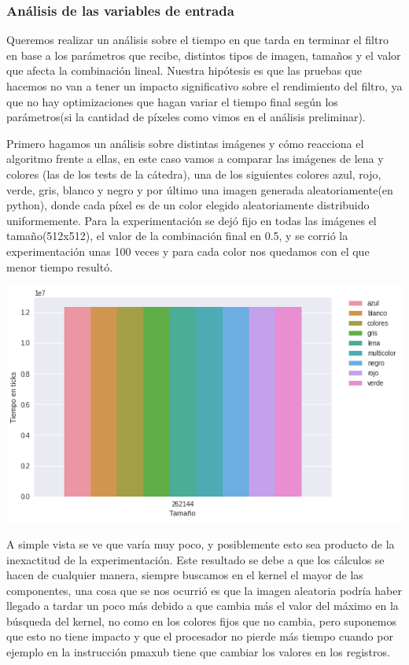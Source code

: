 \subsubsection*{Análisis de las variables de entrada}

Queremos realizar un análisis sobre el tiempo en que tarda en terminar el filtro en base a los parámetros que recibe, distintos tipos de imagen, tamaños y el valor que afecta la combinación lineal. Nuestra hipótesis es que las pruebas que hacemos no van a tener un impacto significativo sobre el rendimiento del filtro, ya que no hay optimizaciones que hagan variar el tiempo final según los parámetros(si la cantidad de píxeles como vimos en el análisis preliminar).

Primero hagamos un análisis sobre distintas imágenes y cómo reacciona el algoritmo frente a ellas, en este caso vamos a comparar las imágenes de lena y colores (las de los tests de la cátedra), una de los siguientes colores azul, rojo, verde, gris, blanco y negro y por último una imagen generada aleatoriamente(en python), donde cada píxel es de un color elegido aleatoriamente distribuido uniformemente. Para la experimentación se dejó fijo en todas las imágenes el tamaño(512x512), el valor de la combinación final en 0.5, y se corrió la experimentación unas 100 veces y para cada color nos quedamos con el que menor tiempo resultó.

\begin{center} 
	\includegraphics[scale=0.5]{img/maxCloser_PARAM_IMG.png}
\end{center}

A simple vista se ve que varía muy poco, y posiblemente esto sea producto de la inexactitud de la experimentación. Este resultado se debe a que los cálculos se hacen de cualquier manera, siempre buscamos en el kernel el mayor de las componentes, una cosa que se nos ocurrió es que la imagen aleatoria podría haber llegado a tardar un poco más debido a que cambia más el valor del máximo en la búsqueda del kernel, no como en los colores fijos que no cambia, pero suponemos que esto no tiene impacto y que el procesador no pierde más tiempo cuando por ejemplo en la instrucción pmaxub tiene que cambiar los valores en los registros.

